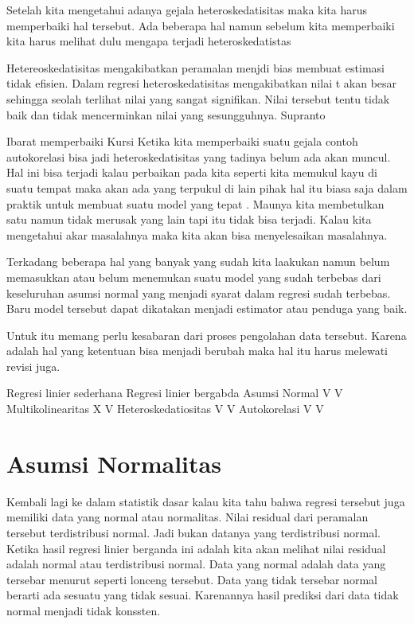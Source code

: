 \documentclass[
]{book}
\theoremstyle{definition}
\theoremstyle{definition}
\theoremstyle{definition}
\theoremstyle{definition}
\theoremstyle{remark}
\begin{document}
Setelah kita mengetahui adanya gejala heteroskedatisitas maka kita harus memperbaiki hal tersebut. Ada beberapa hal namun sebelum kita memperbaiki kita harus melihat dulu mengapa terjadi heteroskedatistas

Hetereoskedatisitas mengakibatkan peramalan menjdi bias membuat estimasi tidak efisien. Dalam regresi heteroskedatisitas mengakibatkan nilai t akan besar sehingga seolah terlihat nilai yang sangat signifikan. Nilai tersebut tentu tidak baik dan tidak mencerminkan nilai yang sesungguhnya. Supranto

Ibarat memperbaiki Kursi
Ketika kita memperbaiki suatu gejala contoh autokorelasi bisa jadi heteroskedatisitas yang tadinya belum ada akan muncul. Hal ini bisa terjadi kalau perbaikan pada kita seperti kita memukul kayu di suatu tempat maka akan ada yang terpukul di lain pihak hal itu biasa saja dalam praktik untuk membuat suatu model yang tepat . Maunya kita membetulkan satu namun tidak merusak yang lain tapi itu tidak bisa terjadi. Kalau kita mengetahui akar masalahnya maka kita akan bisa menyelesaikan masalahnya.

Terkadang beberapa hal yang banyak yang sudah kita laakukan namun belum memasukkan atau belum menemukan suatu model yang sudah terbebas dari keseluruhan asumsi normal yang menjadi syarat dalam regresi sudah terbebas. Baru model tersebut dapat dikatakan menjadi estimator atau penduga yang baik.

Untuk itu memang perlu kesabaran dari proses pengolahan data tersebut. Karena adalah hal yang ketentuan bisa menjadi berubah maka hal itu harus melewati revisi juga.

Regresi linier sederhana Regresi linier bergabda
Asumsi Normal V V
Multikolinearitas X V
Heteroskedatiositas V V
Autokorelasi V V

\hypertarget{asumsi-normalitas}{%
\section{Asumsi Normalitas}\label{asumsi-normalitas}}

Kembali lagi ke dalam statistik dasar kalau kita tahu bahwa regresi tersebut juga memiliki data yang normal atau normalitas. Nilai residual dari peramalan tersebut terdistribusi normal. Jadi bukan datanya yang terdistribusi normal. Ketika hasil regresi linier berganda ini adalah kita akan melihat nilai residual adalah normal atau terdistribusi normal. Data yang normal adalah data yang tersebar menurut seperti lonceng tersebut. Data yang tidak tersebar normal berarti ada sesuatu yang tidak sesuai. Karenannya hasil prediksi dari data tidak normal menjadi tidak konssten.
\end{document}
